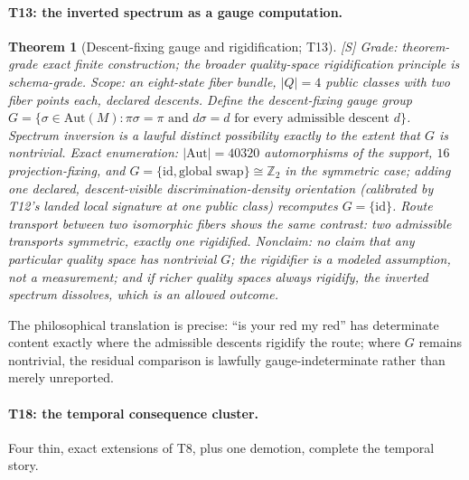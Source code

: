 \documentclass[11pt]{article}
\newcommand{\gradeS}{\textsf{[S]}}
\newtheorem{theorem}{Theorem}[section]
\theoremstyle{definition}
\begin{document}
\paragraph{T13: the inverted spectrum as a gauge computation.}
\begin{theorem}[Descent-fixing gauge and rigidification; T13]
\gradeS{} \emph{Grade:} theorem-grade exact finite construction; the broader
quality-space rigidification principle is schema-grade. \emph{Scope:} an
eight-state fiber bundle, $|Q| = 4$ public classes with two fiber points
each, declared descents. Define the descent-fixing gauge group
$G = \{\sigma \in \mathrm{Aut}(M) : \pi\sigma = \pi \text{ and } d\sigma = d
\text{ for every admissible descent } d\}$. Spectrum inversion is a lawful
distinct possibility exactly to the extent that $G$ is nontrivial. Exact
enumeration: $|\mathrm{Aut}|=40320$ automorphisms of the support, $16$
projection-fixing, and $G = \{\mathrm{id}, \text{global swap}\} \cong
\mathbb{Z}_2$ in the symmetric case; adding \emph{one} declared,
descent-visible discrimination-density orientation (calibrated by T12's
landed local signature at one public class) recomputes $G = \{\mathrm{id}\}$.
Route transport between two isomorphic fibers shows the same contrast: two
admissible transports symmetric, exactly one rigidified. \emph{Nonclaim:} no
claim that any particular quality space has nontrivial $G$; the rigidifier is
a modeled assumption, not a measurement; and if richer quality spaces always
rigidify, the inverted spectrum dissolves, which is an allowed outcome.
\end{theorem}

The philosophical translation is precise: ``is your red my red'' has
determinate content exactly where the admissible descents rigidify the route;
where $G$ remains nontrivial, the residual comparison is lawfully
gauge-indeterminate rather than merely unreported.

\paragraph{T18: the temporal consequence cluster.}
Four thin, exact extensions of T8, plus one demotion, complete the temporal
story.
\end{document}

